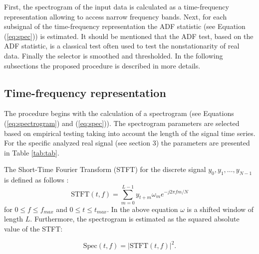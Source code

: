 \documentclass[11pt]{article}
\begin{document}
First, the spectrogram of the input data is calculated as a time-frequency representation allowing to access narrow frequency bands. Next, for each subsignal of the time-frequency representation the ADF statistic  (see Equation (\ref{eq:spec})) is estimated. It should be mentioned that the ADF test, based on the ADF statistic,  is a classical test often used to test the nonstationarity of real data. Finally the selector is smoothed and thresholded.  In the following subsections the proposed procedure is described in more details.

\subsection{Time-frequency representation}
The procedure begins with the calculation of a spectrogram (see Equations (\ref{eq:spectrogram}) and (\ref{eq:spec})). The spectrogram parameters are selected based on empirical testing taking into account the length of the signal time series. For the specific analyzed real signal (see section 3) the parameters are presented in Table \ref{tab:tab}.

The Short-Time Fourier Transform (STFT) for the discrete signal $y_0, y_1, \dots , y_{N-1}$ is defined as follows \cite{oppenheim1999discrete}:
\begin{equation}
\label{eq:spectrogram}
\textrm{STFT}(t,f)=\sum_{m=0}^{L-1} y_{t+m}\omega_{m}e^{-j2\pi fm/N}
\end{equation}
for $0\leq f\leq f_{max}$ and $0\leq t\leq t_{max}$. In the above equation $\omega$ is a shifted window of length $L$. Furthermore, the spectrogram is estimated as the squared absolute value of the STFT:

\begin{equation}
\label{eq:spec}
\textrm{Spec}(t,f)=|\textrm{STFT}(t,f)|^2.
\end{equation}
\end{document}
